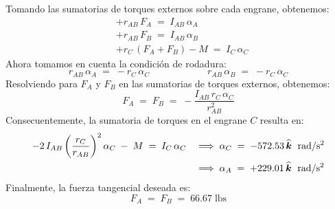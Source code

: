 \documentclass[ a4paper, twoside, 11pt]{article}
\begin{document}
\begin{problem}
Tomando las sumatorias de torques externos sobre cada engrane, obtenemos:
\begin{align*}
& +r_{AB} \, F_A \; = \; I_{AB} \, \alpha_A \\
& +r_{AB} \, F_B \; = \; I_{AB} \, \alpha_B \\
& + r_C \, ( F_A + F_B ) - M \; = \; I_C \, \alpha_C
\end{align*}
Ahora tomamos en cuenta la condici\'on de rodadura: 
\[
r_{AB} \, \alpha_A \; = \; -r_C \, \alpha_C \qquad \qquad \qquad
r_{AB} \, \alpha_B \; = \; -r_C \, \alpha_C
\]
Resolviendo para $F_A$ y $F_B$ en las sumatorias de torques externos, obtenemos: 
\[
F_A \; = \; F_B \; = \; -\frac{ I_{AB} \, r_C \, \alpha_C }{r_{AB}^2}
\]
Consecuentemente, la sumatoria de torques en el engrane $C$ resulta en:
\begin{align*}
-2 \, I_{AB} \left( \frac{r_C}{r_{AB}} \right)^2 \alpha_C \; - \; M
\; = \; I_C \, \alpha_C \quad
& \Longrightarrow \;
\alpha_C \; = \; -572.53 \, {\boldsymbol{\widehat{k}}} \; \text{ rad/s\ensuremath{^{\text{2}}}} \\
& \Longrightarrow \;
\alpha_A \; = \; +229.01 \, {\boldsymbol{\widehat{k}}} \; \text{ rad/s\ensuremath{^{\text{2}}}}
\end{align*}
Finalmente, la fuerza tangencial deseada es: 
\[
F_A \; = \; F_B \; = \; 66.67 \; \text{lbs}
\]
\QED

\end{problem}
\fullskip
\end{document}
